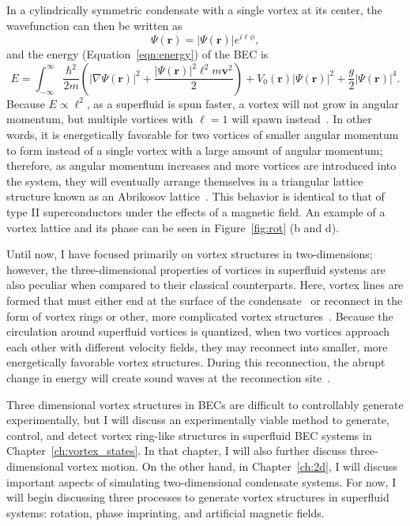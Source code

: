 In a cylindrically symmetric condensate with a single vortex at its center, the wavefunction can then be written as
\begin{equation}
\Psi(\mathbf{r}) = |\Psi(\mathbf{r})|e^{i\ell\phi},
\end{equation}
and the energy (Equation~\eqref{eqn:energy}) of the BEC is
\begin{equation}
E = \int_{-\infty}^\infty \frac{\hbar^2}{2m}\left( |\nabla\Psi(\mathbf{r})|^2 + \frac{|\Psi(\mathbf{r})|^2\ell^2 m\mathbf{v}^2}{2}\right) + V_0(\mathbf{r})|\Psi(\mathbf{r})|^2 + \frac{g}{2}|\Psi(\mathbf{r})|^4.
\end{equation}
\noindent Because $E \propto \ell^2$, as a superfluid is spun faster, a vortex will not grow in angular momentum, but multiple vortices with $\ell = 1$ will spawn instead~\cite{pethick2002}.
In other words, it is energetically favorable for two vortices of smaller angular momentum to form instead of a single vortex with a large amount of angular momentum;
therefore, as angular momentum increases and more vortices are introduced into the system, they will eventually arrange themselves in a triangular lattice structure known as an Abrikosov lattice~\cite{abrikosov1957, fetter2001}.
This behavior is identical to that of type II superconductors under the effects of a magnetic field.
An example of a vortex lattice and its phase can be seen in Figure~\ref{fig:rot} (b and d).

Until now, I have focused primarily on vortex structures in two-dimensions; however, 
the three-dimensional properties of vortices in superfluid systems are also peculiar when compared to their classical counterparts.
Here, vortex lines are formed that must either end at the surface of the condensate~\cite{madison2000} or reconnect in the form of vortex rings or other, more complicated vortex structures~\cite{reichl2013, barenghi2014}.
Because the circulation around superfluid vortices is quantized, when two vortices approach each other with different velocity fields, they may reconnect into smaller, more energetically favorable vortex structures.
During this reconnection, the abrupt change in energy will create sound waves at the reconnection site~\cite{feynman1955}.

Three dimensional vortex structures in BECs are difficult to controllably generate experimentally, but I will discuss an experimentally viable method to generate, control, and detect vortex ring-like structures in superfluid BEC systems in Chapter~\ref{ch:vortex_states}.
In that chapter, I will also further discuss three-dimensional vortex motion.
On the other hand, in Chapter~\ref{ch:2d}, I will discuss important aspects of simulating two-dimensional condensate systems.
 For now, I will begin discussing three processes to generate vortex structures in superfluid systems: rotation, phase imprinting, and artificial magnetic fields.

